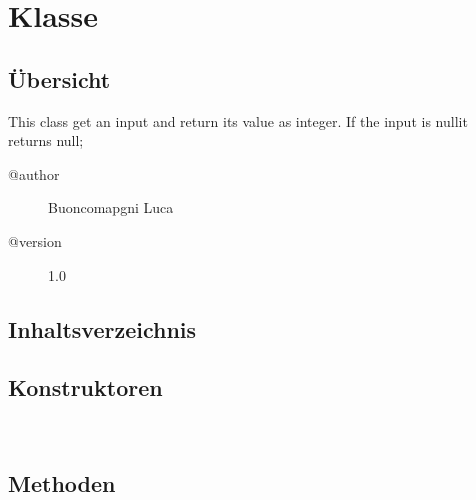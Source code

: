 
\section[AsInteger]{Klasse }\label{ontologyFramework.OFEventManagement.OFEventParameter.AsInteger-class}
\subsection{Übersicht}
This class get an input and return its value as integer.
 If the input is \textquotedbl null\textquotedbl  it returns \textquotedbl null\textquotedbl ;
\begin{description}
\item[@author] 
Buoncomapgni Luca
\item[@version] 
1.0
\end{description}
\subsection{Inhaltsverzeichnis}
\subsection{Konstruktoren}
\begin{description}
\item[{\label{ontologyFramework.OFEventManagement.OFEventParameter.AsInteger()}}]
~ 
\end{description}
\subsection{Methoden}
\begin{description}
\item[{\label{ontologyFramework.OFEventManagement.OFEventParameter.AsInteger.getParameter(java.lang.Object,ontologyFramework.OFContextManagement.OWLReferences)}}]
~ 
\end{description}
